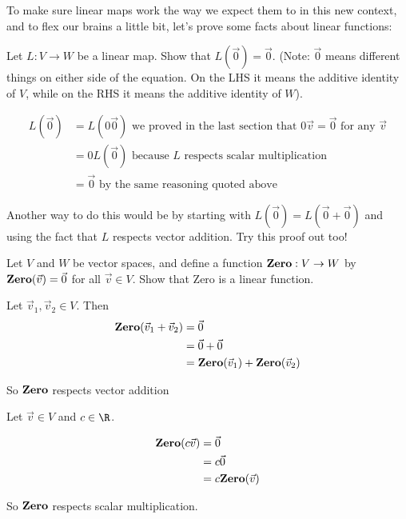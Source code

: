 \documentclass{ximera}
\begin{document}
To make sure linear maps work the way we expect them to in this new context, and to flex our brains a little bit, let's prove some facts about linear functions:

	Let $L:V \to W$ be a linear map.  Show that $L(\vec{0}) = \vec{0}$. 
	(Note: $\vec{0}$ means different things on either side of the equation.  On the LHS it means the additive identity of $V$, while on the RHS it means the 
	additive identity of $W$).

\begin{free-response}
	\begin{align*}
		L(\vec{0}) &= L(0\vec{0}) \text{ we proved in the last section that $0\vec{v} = \vec{0}$ for any $\vec{v}$}\\
						&= 0L(\vec{0}) \text{ because $L$ respects scalar multiplication}\\
						&=\vec{0} \text{ by the same reasoning quoted above}
	\end{align*}
	
	Another way to do this would be by starting with $L(\vec{0}) = L(\vec{0}+\vec{0})$ and using the fact that $L$ respects vector addition.  Try this proof out too!
	\end{free-response}

	Let $V$ and $W$ be vector spaces, and define a function $\text{\textbf{Zero}}: V \to W$ by $\text{\textbf{Zero}}(\vec{v}) = \vec{0}$ for all $\vec{v} \in V$.  Show that 
	$\mathrm{Zero}$ is a linear function. 

\begin{free-response}
	Let $\vec{v}_1,\vec{v}_2 \in V$.  Then
	\begin{align*}
		\text{\textbf{Zero}}(\vec{v}_1+\vec{v}_2) &= \vec{0}\\
						&= \vec{0}+\vec{0}\\
						&= \text{\textbf{Zero}}(\vec{v}_1)+\text{\textbf{Zero}}(\vec{v}_2)
	\end{align*}
	
	So $\text{\textbf{Zero}}$ respects vector addition
	
	Let $\vec{v} \in V$ and $c \in \R$.
	
	\begin{align*}
		\text{\textbf{Zero}}(c\vec{v}) &= \vec{0}\\
						&= c\vec{0}\\
						&= c\text{\textbf{Zero}}(\vec{v})
	\end{align*}
	
	So $\text{\textbf{Zero}}$ respects scalar multiplication.
	
\end{free-response}
\end{document}
